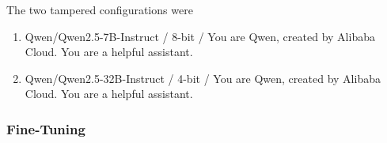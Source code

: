 \documentclass{article}
\begin{document}
The two tampered configurations were
\begin{enumerate}
  \item {\small\ttfamily Qwen/Qwen2.5-7B-Instruct / 8-bit / You are Qwen,
  created by Alibaba Cloud. You are a helpful assistant.}~\citep{qwen25_7b_instruct_hf}
  \item {\small\ttfamily Qwen/Qwen2.5-32B-Instruct / 4-bit / You are Qwen,
  created by Alibaba Cloud. You are a helpful assistant.}~\citep{qwen25_32b_instruct_hf}
\end{enumerate}

\subsubsection{Fine-Tuning}
\label{app:proof-of-concept-configurations-fine-tuning}
\end{document}
